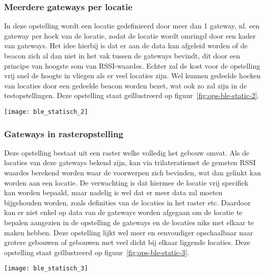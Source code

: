 \subsubsection{Meerdere gateways per locatie}
\begin{minipage}{0.65\textwidth}
In deze opstelling wordt een locatie gedefinieerd door meer dan 1 gateway, nl. een gateway per hoek van de locatie, zodat de locatie wordt omringd door een kader van gateways. Het idee hierbij is dat er aan de data kan afgeleid worden of de beacon zich al dan niet in het vak tussen de gateways bevindt, dit door een principe van hoogste som van RSSI-waardes. Echter zal de kost voor de opstelling vrij snel de hoogte in vliegen als er veel locaties zijn. Wel kunnen gedeelde hoeken van locaties door een gedeelde beacon worden bezet, wat ook zo zal zijn in de testopstellingen. Deze opstelling staat geïllustreerd op figuur~\ref{fig:ops-ble-static-2}.
\end{minipage}
\hfill
\begin{minipage}{0.30\textwidth}
	\texttt{[image: ble\_statisch\_2]}
	\label{fig:ops-ble-static-2}
\end{minipage}

\subsubsection{Gateways in rasteropstelling}
\begin{minipage}{0.65\textwidth}
Deze opstelling bestaat uit een raster welke volledig het gebouw omvat. Als de locaties van deze gateways bekend zijn, kan via trilateratie\footnotemark met de gemeten RSSI waardes berekend worden waar de voorwerpen zich bevinden, wat dan gelinkt kan worden aan een locatie. De verwachting is dat hiermee de locatie vrij specifiek kan worden bepaald, maar nadelig is wel dat er meer data zal moeten bijgehouden worden, zoals definities van de locaties in het raster etc. Daardoor kan er niet enkel op data van de gateways worden afgegaan om de locatie te bepalen aangezien in de opstelling de gateways en de locaties niks met elkaar te maken hebben. Deze opstelling lijkt wel meer en eenvoudiger opschaalbaar naar grotere gebouwen of gebouwen met veel dicht bij elkaar liggende locaties. Deze opstelling staat geïllustreerd op figuur~\ref{fig:ops-ble-static-3}.
\end{minipage}
\hfill
\begin{minipage}{0.30\textwidth}
	\texttt{[image: ble\_statisch\_3]}
	\label{fig:ops-ble-static-3}
\end{minipage}


